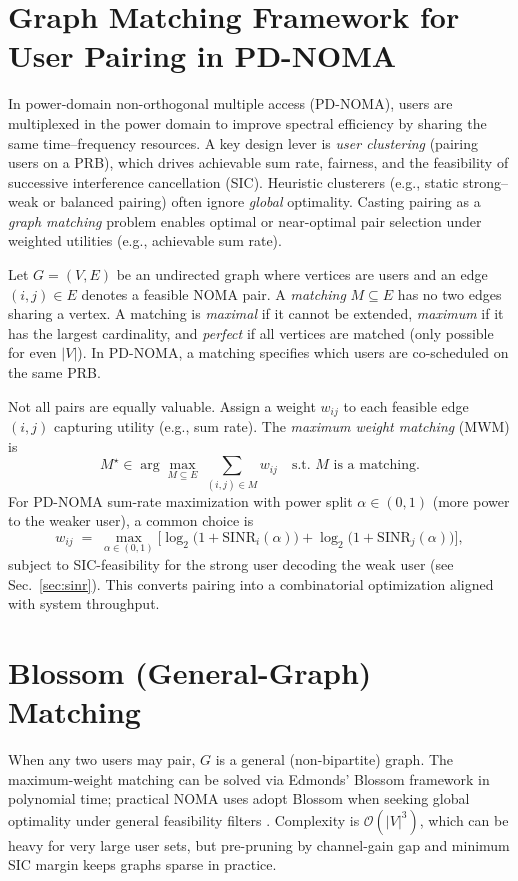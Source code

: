 \section{Graph Matching Framework for User Pairing in PD\mbox{-}NOMA}
\label{sec:graph-matching}

In power-domain non-orthogonal multiple access (PD\mbox{-}NOMA), users are multiplexed in the power domain to improve spectral efficiency by sharing the same time–frequency resources. A key design lever is \emph{user clustering} (pairing users on a PRB), which drives achievable sum rate, fairness, and the feasibility of successive interference cancellation (SIC). Heuristic clusterers (e.g., static strong–weak or balanced pairing) often ignore \emph{global} optimality. Casting pairing as a \emph{graph matching} problem enables optimal or near-optimal pair selection under weighted utilities (e.g., achievable sum rate).

Let $G=(V,E)$ be an undirected graph where vertices are users and an edge $(i,j)\!\in\!E$ denotes a feasible NOMA pair. A \emph{matching} $M\!\subseteq\!E$ has no two edges sharing a vertex. A matching is \emph{maximal} if it cannot be extended, \emph{maximum} if it has the largest cardinality, and \emph{perfect} if all vertices are matched (only possible for even $|V|$). In PD\mbox{-}NOMA, a matching specifies which users are co-scheduled on the same PRB.


Not all pairs are equally valuable. Assign a weight $w_{ij}$ to each feasible edge $(i,j)$ capturing utility (e.g., sum rate). The \emph{maximum weight matching} (MWM) is
\begin{equation}
\label{eq:mwm}
M^\star \in \arg\max_{M \subseteq E} \ \sum_{(i,j)\in M} w_{ij}
\quad\text{s.t. $M$ is a matching.}
\end{equation}
For PD\mbox{-}NOMA sum-rate maximization with power split $\alpha\!\in\!(0,1)$ (more power to the weaker user), a common choice is
\begin{equation}
\label{eq:wij}
w_{ij} \;=\; \max_{\alpha\in(0,1)} 
\Big[\log_2\!\big(1+\mathrm{SINR}_i(\alpha)\big) + \log_2\!\big(1+\mathrm{SINR}_j(\alpha)\big)\Big],
\end{equation}
subject to SIC-feasibility for the strong user decoding the weak user (see Sec.~\ref{sec:sinr}). This converts pairing into a combinatorial optimization aligned with system throughput.

\section*{Blossom (General-Graph) Matching}
When any two users may pair, $G$ is a general (non-bipartite) graph. The maximum-weight matching can be solved via Edmonds’ Blossom framework in polynomial time; practical NOMA uses adopt Blossom when seeking global optimality under general feasibility filters \cite{kose2021}. Complexity is $\mathcal{O}(|V|^3)$, which can be heavy for very large user sets, but pre-pruning by channel-gain gap and minimum SIC margin keeps graphs sparse in practice.

